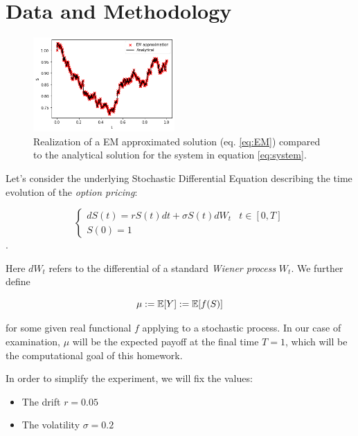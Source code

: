 \section{Data and Methodology}

\begin{figure}
  \begin{center}
    \includegraphics[width=0.48\textwidth]{graphics/em_simulation.png}
  \end{center}
  \caption{Realization of a EM approximated solution (eq. \ref{eq:EM}) compared to the analytical solution for the system in equation \ref{eq:system}.}
    \label{fig:em_vs_analytical}
\end{figure}

Let's consider the underlying Stochastic Differential Equation describing the time evolution of the \textit{option pricing}:

\begin{equation}\label{eq:system}
\begin{cases}
    dS(t) = rS(t)dt + \sigma S(t)dW_t &  t \in [0, T]\\
    S(0) = 1 &
\end{cases}
\end{equation}.

Here $dW_t$ refers to the differential of a standard \textit{Wiener process} $W_t$. We further define

\begin{equation}\label{eq:payoff}
    \mu := \mathbb{E}[Y] := \mathbb{E}[f(S)]
\end{equation}

for some given real functional $f$ applying to a stochastic process.
In our case of examination, $\mu$ will be the expected payoff at the final time $T = 1$, which will be the computational goal of this homework. 

In order to simplify the experiment, we will fix the values:

\begin{itemize}
\setlength\itemsep{0.05em}
\item The drift $r = 0.05$
\item The volatility $\sigma = 0.2$
\end{itemize}

